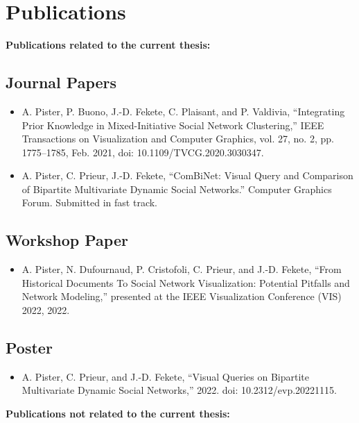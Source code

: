\chapter*{Publications}

\textbf{Publications related to the current thesis:}
\section*{Journal Papers}

\begin{itemize}
    \item A. Pister, P. Buono, J.-D. Fekete, C. Plaisant, and P. Valdivia, “Integrating Prior Knowledge in Mixed-Initiative Social Network Clustering,” IEEE Transactions on Visualization and Computer Graphics, vol. 27, no. 2, pp. 1775–1785, Feb. 2021, doi: 10.1109/TVCG.2020.3030347.
    \item A. Pister, C. Prieur, J.-D. Fekete, ``ComBiNet: Visual Query and Comparison of Bipartite Multivariate Dynamic Social Networks.'' Computer Graphics Forum. Submitted in fast track.
\end{itemize}

\section*{Workshop Paper}

\begin{itemize}
    \item A. Pister, N. Dufournaud, P. Cristofoli, C. Prieur, and J.-D. Fekete, “From Historical Documents To Social Network Visualization: Potential Pitfalls and Network Modeling,” presented at the IEEE Visualization Conference (VIS) 2022, 2022.
\end{itemize}


\section*{Poster}

\begin{itemize}
    \item  A. Pister, C. Prieur, and J.-D. Fekete, “Visual Queries on Bipartite Multivariate Dynamic Social Networks,” 2022. doi: 10.2312/evp.20221115.
\end{itemize}


\vspace{5em}

\textbf{Publications not related to the current thesis:}
